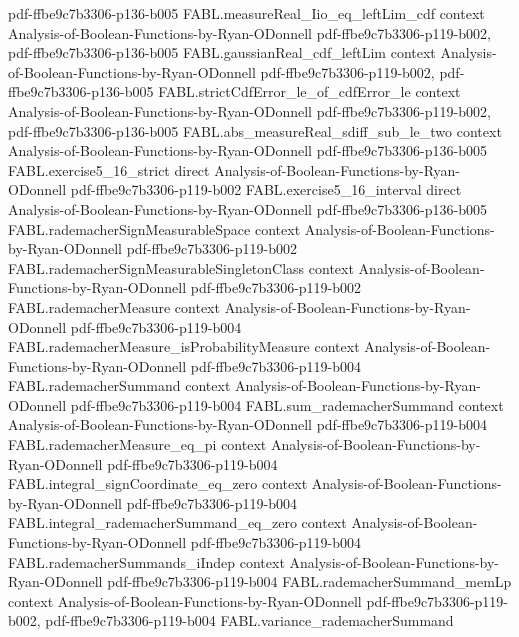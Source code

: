 \begin{theorem}
  {pdf-ffbe9c7b3306-p136-b005}
\proofstep
  {FABL.measureReal_Iio_eq_leftLim_cdf}
  {context}
  {Analysis-of-Boolean-Functions-by-Ryan-ODonnell}
  {pdf-ffbe9c7b3306-p119-b002,
    pdf-ffbe9c7b3306-p136-b005}
\proofstep
  {FABL.gaussianReal_cdf_leftLim}
  {context}
  {Analysis-of-Boolean-Functions-by-Ryan-ODonnell}
  {pdf-ffbe9c7b3306-p119-b002,
    pdf-ffbe9c7b3306-p136-b005}
\proofstep
  {FABL.strictCdfError_le_of_cdfError_le}
  {context}
  {Analysis-of-Boolean-Functions-by-Ryan-ODonnell}
  {pdf-ffbe9c7b3306-p119-b002,
    pdf-ffbe9c7b3306-p136-b005}
\proofstep
  {FABL.abs_measureReal_sdiff_sub_le_two}
  {context}
  {Analysis-of-Boolean-Functions-by-Ryan-ODonnell}
  {pdf-ffbe9c7b3306-p136-b005}
\proofstep
  {FABL.exercise5_16_strict}
  {direct}
  {Analysis-of-Boolean-Functions-by-Ryan-ODonnell}
  {pdf-ffbe9c7b3306-p119-b002}
\proofstep
  {FABL.exercise5_16_interval}
  {direct}
  {Analysis-of-Boolean-Functions-by-Ryan-ODonnell}
  {pdf-ffbe9c7b3306-p136-b005}
\proofstep
  {FABL.rademacherSignMeasurableSpace}
  {context}
  {Analysis-of-Boolean-Functions-by-Ryan-ODonnell}
  {pdf-ffbe9c7b3306-p119-b002}
\proofstep
  {FABL.rademacherSignMeasurableSingletonClass}
  {context}
  {Analysis-of-Boolean-Functions-by-Ryan-ODonnell}
  {pdf-ffbe9c7b3306-p119-b002}
\proofstep
  {FABL.rademacherMeasure}
  {context}
  {Analysis-of-Boolean-Functions-by-Ryan-ODonnell}
  {pdf-ffbe9c7b3306-p119-b004}
\proofstep
  {FABL.rademacherMeasure_isProbabilityMeasure}
  {context}
  {Analysis-of-Boolean-Functions-by-Ryan-ODonnell}
  {pdf-ffbe9c7b3306-p119-b004}
\proofstep
  {FABL.rademacherSummand}
  {context}
  {Analysis-of-Boolean-Functions-by-Ryan-ODonnell}
  {pdf-ffbe9c7b3306-p119-b004}
\proofstep
  {FABL.sum_rademacherSummand}
  {context}
  {Analysis-of-Boolean-Functions-by-Ryan-ODonnell}
  {pdf-ffbe9c7b3306-p119-b004}
\proofstep
  {FABL.rademacherMeasure_eq_pi}
  {context}
  {Analysis-of-Boolean-Functions-by-Ryan-ODonnell}
  {pdf-ffbe9c7b3306-p119-b004}
\proofstep
  {FABL.integral_signCoordinate_eq_zero}
  {context}
  {Analysis-of-Boolean-Functions-by-Ryan-ODonnell}
  {pdf-ffbe9c7b3306-p119-b004}
\proofstep
  {FABL.integral_rademacherSummand_eq_zero}
  {context}
  {Analysis-of-Boolean-Functions-by-Ryan-ODonnell}
  {pdf-ffbe9c7b3306-p119-b004}
\proofstep
  {FABL.rademacherSummands_iIndep}
  {context}
  {Analysis-of-Boolean-Functions-by-Ryan-ODonnell}
  {pdf-ffbe9c7b3306-p119-b004}
\proofstep
  {FABL.rademacherSummand_memLp}
  {context}
  {Analysis-of-Boolean-Functions-by-Ryan-ODonnell}
  {pdf-ffbe9c7b3306-p119-b002,
    pdf-ffbe9c7b3306-p119-b004}
\proofstep
  {FABL.variance_rademacherSummand}

\end{theorem}

